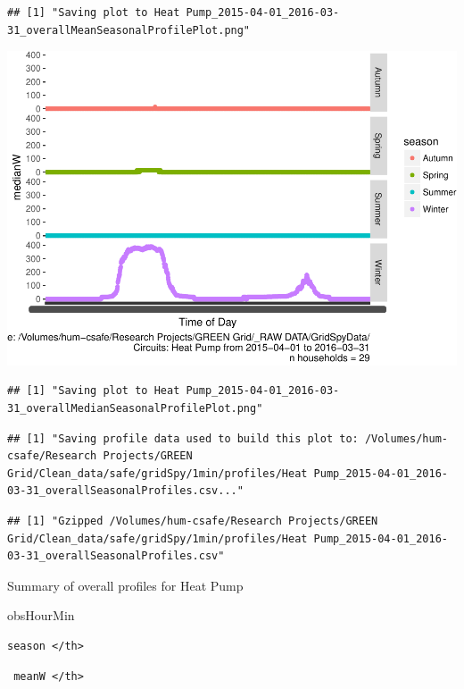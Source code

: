 \documentclass[]{article}
\begin{document}
\begin{verbatim}
## [1] "Saving plot to Heat Pump_2015-04-01_2016-03-31_overallMeanSeasonalProfilePlot.png"
\end{verbatim}

\includegraphics{nzGGHouseholdPowerDemandProfile_Heat Pump_2015-04-01_2016-03-31_files/figure-latex/overall profiles by season-2.pdf}

\begin{verbatim}
## [1] "Saving plot to Heat Pump_2015-04-01_2016-03-31_overallMedianSeasonalProfilePlot.png"
\end{verbatim}

\begin{verbatim}
## [1] "Saving profile data used to build this plot to: /Volumes/hum-csafe/Research Projects/GREEN Grid/Clean_data/safe/gridSpy/1min/profiles/Heat Pump_2015-04-01_2016-03-31_overallSeasonalProfiles.csv..."
\end{verbatim}

\begin{verbatim}
## [1] "Gzipped /Volumes/hum-csafe/Research Projects/GREEN Grid/Clean_data/safe/gridSpy/1min/profiles/Heat Pump_2015-04-01_2016-03-31_overallSeasonalProfiles.csv"
\end{verbatim}

Summary of overall profiles for Heat Pump

obsHourMin

\begin{verbatim}
season </th>
\end{verbatim}

\begin{verbatim}
 meanW </th>
\end{verbatim}
\end{document}
